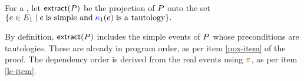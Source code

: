 \begin{definition}
  \label{def:extract}
  For a \PwTpo{}, let $\fextract{\aPS}$ be the projection
  of $P$ onto the set
  \begin{math}
    \{e\in E_1\mid\allowbreak e \;\text{is simple and}\; {\color{blue}\kappa}_1(e) \;\text{is a tautology} \}.
  \end{math}
\end{definition}
By definition, $\fextract{\aPS}$ includes the simple events of $P$ whose
preconditions are tautologies.  These are already in program order, as per
item \ref{pox-item} of the proof.  The dependency order is derived from the
real events using $\fmrg{}$, as per item \ref{le-item}.

